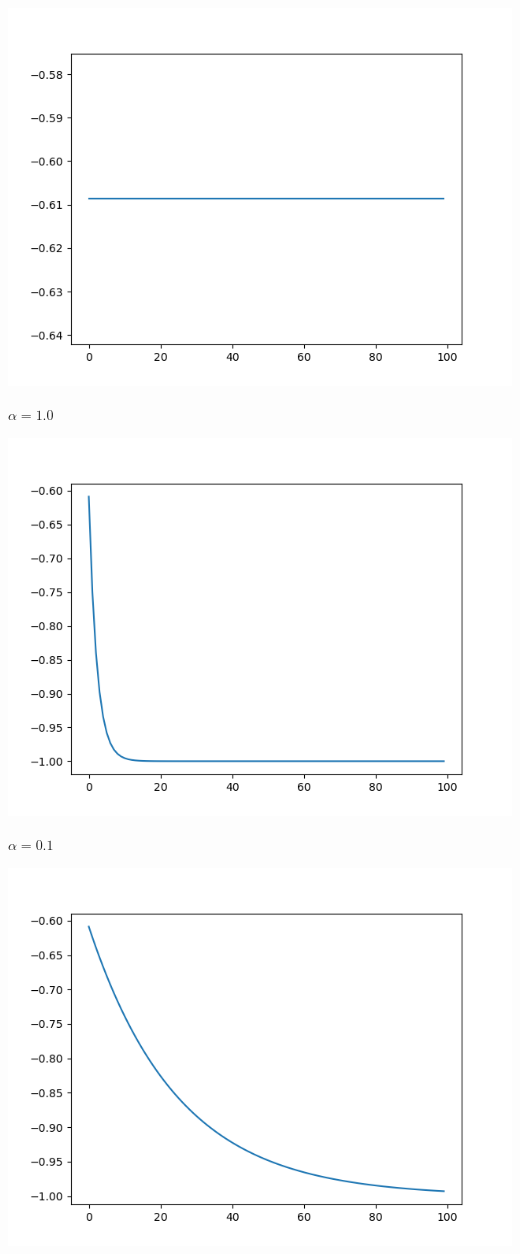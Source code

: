 \documentclass[12pt]{article}
\begin{document}
\begin{center}
    
    \includegraphics[scale=0.6]{q1_grad_plot_1.png}
    
    $\alpha = 1.0$
    
    \includegraphics[scale=0.6]{q1_grad_plot_2.png}
    
    $\alpha = 0.1$
    
    \includegraphics[scale=0.6]{q1_grad_plot_3.png}
    

\end{center}
\end{document}
